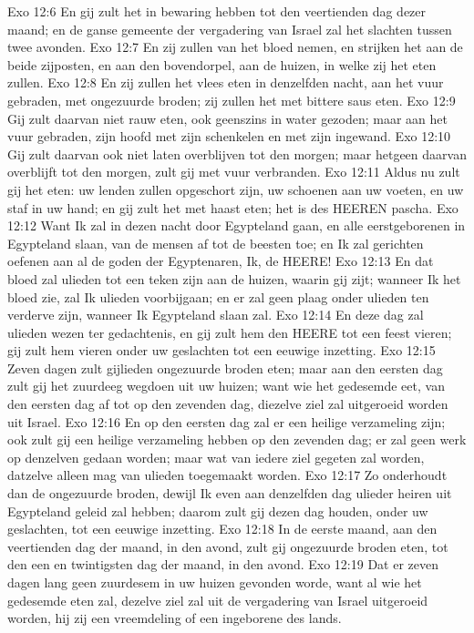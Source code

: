 Exo 12:6  En gij zult het in bewaring hebben tot den veertienden dag dezer maand; en de ganse gemeente der vergadering van Israel zal het slachten tussen twee avonden.
Exo 12:7  En zij zullen van het bloed nemen, en strijken het aan de beide zijposten, en aan den bovendorpel, aan de huizen, in welke zij het eten zullen.
Exo 12:8  En zij zullen het vlees eten in denzelfden nacht, aan het vuur gebraden, met ongezuurde broden; zij zullen het met bittere saus eten.
Exo 12:9  Gij zult daarvan niet rauw eten, ook geenszins in water gezoden; maar aan het vuur gebraden, zijn hoofd met zijn schenkelen en met zijn ingewand.
Exo 12:10  Gij zult daarvan ook niet laten overblijven tot den morgen; maar hetgeen daarvan overblijft tot den morgen, zult gij met vuur verbranden.
Exo 12:11  Aldus nu zult gij het eten: uw lenden zullen opgeschort zijn, uw schoenen aan uw voeten, en uw staf in uw hand; en gij zult het met haast eten; het is des HEEREN pascha.
Exo 12:12  Want Ik zal in dezen nacht door Egypteland gaan, en alle eerstgeborenen in Egypteland slaan, van de mensen af tot de beesten toe; en Ik zal gerichten oefenen aan al de goden der Egyptenaren, Ik, de HEERE!
Exo 12:13  En dat bloed zal ulieden tot een teken zijn aan de huizen, waarin gij zijt; wanneer Ik het bloed zie, zal Ik ulieden voorbijgaan; en er zal geen plaag onder ulieden ten verderve zijn, wanneer Ik Egypteland slaan zal.
Exo 12:14  En deze dag zal ulieden wezen ter gedachtenis, en gij zult hem den HEERE tot een feest vieren; gij zult hem vieren onder uw geslachten tot een eeuwige inzetting.
Exo 12:15  Zeven dagen zult gijlieden ongezuurde broden eten; maar aan den eersten dag zult gij het zuurdeeg wegdoen uit uw huizen; want wie het gedesemde eet, van den eersten dag af tot op den zevenden dag, diezelve ziel zal uitgeroeid worden uit Israel.
Exo 12:16  En op den eersten dag zal er een heilige verzameling zijn; ook zult gij een heilige verzameling hebben op den zevenden dag; er zal geen werk op denzelven gedaan worden; maar wat van iedere ziel gegeten zal worden, datzelve alleen mag van ulieden toegemaakt worden.
Exo 12:17  Zo onderhoudt dan de ongezuurde broden, dewijl Ik even aan denzelfden dag ulieder heiren uit Egypteland geleid zal hebben; daarom zult gij dezen dag houden, onder uw geslachten, tot een eeuwige inzetting.
Exo 12:18  In de eerste maand, aan den veertienden dag der maand, in den avond, zult gij ongezuurde broden eten, tot den een en twintigsten dag der maand, in den avond.
Exo 12:19  Dat er zeven dagen lang geen zuurdesem in uw huizen gevonden worde, want al wie het gedesemde eten zal, dezelve ziel zal uit de vergadering van Israel uitgeroeid worden, hij zij een vreemdeling of een ingeborene des lands.

